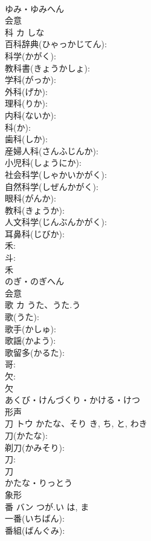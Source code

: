 \documentclass[8pt]{extreport}
\begin{document}
\begin{CJK}{UTF8}{min}
\\	ゆみ・ゆみへん	
\\	会意 
\\	科	カ		しな	
\\	百科辞典(ひゃっかじてん): 
\\	科学(かがく): 
\\	教科書(きょうかしょ): 
\\	学科(がっか): 
\\	外科(げか): 
\\	理科(りか): 
\\	内科(ないか): 
\\	科(か): 
\\	歯科(しか): 
\\	産婦人科(さんふじんか): 
\\	小児科(しょうにか): 
\\	社会科学(しゃかいかがく): 
\\	自然科学(しぜんかがく): 
\\	眼科(がんか): 
\\	教科(きょうか): 
\\	人文科学(じんぶんかがく): 
\\	耳鼻科(じびか): 
\\	禾: 
\\	斗: 
\\	禾	
\\	のぎ・のぎへん	
\\	会意 
\\	歌	カ	うた、うた.う		
\\	歌(うた): 
\\	歌手(かしゅ): 
\\	歌謡(かよう): 
\\	歌留多(かるた): 
\\	哥: 
\\	欠: 
\\	欠	
\\	あくび・けんづくり・かける・けつ	
\\	形声 
\\	刀	トウ	かたな、そり	き, ち, と, わき	
\\	刀(かたな): 
\\	剃刀(かみそり): 
\\	刀: 
\\	刀	
\\	かたな・りっとう	
\\	象形 
\\	番	バン	つが.い	は, ま	
\\	一番(いちばん): 
\\	番組(ばんぐみ): 

\end{CJK}
\end{document}
